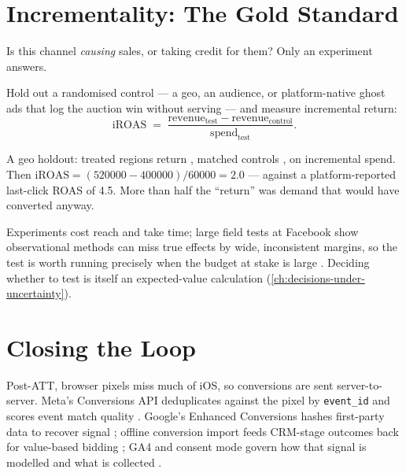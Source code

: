 \section{Incrementality: The Gold Standard}\label{sec:incrementality}

\begin{decision}
Is this channel \emph{causing} sales, or taking credit for them? Only an experiment answers.
\end{decision}

\begin{derivation}
Hold out a randomised control --- a geo, an audience, or platform-native ghost ads that log the auction win without serving \parencite{johnson2017ghost} --- and measure incremental return:
\begin{equation}\label{eq:iroas}
  \mathrm{iROAS} \;=\; \frac{\text{revenue}_\text{test}-\text{revenue}_\text{control}}{\text{spend}_\text{test}} .
\end{equation}
\end{derivation}

\begin{worked}
A geo holdout: treated regions return , matched controls , on  incremental spend. Then $\mathrm{iROAS}=(520000-400000)/60000=\num{2.0}$ --- against a platform-reported last-click ROAS of \num{4.5}. More than half the ``return'' was demand that would have converted anyway.
\end{worked}

\begin{breaks}
Experiments cost reach and take time; large field tests at Facebook show observational methods can miss true effects by wide, inconsistent margins, so the test is worth running precisely when the budget at stake is large \parencite{gordon2019comparison}. Deciding whether to test is itself an expected-value calculation (\cref{ch:decisions-under-uncertainty}).
\end{breaks}

\section{Closing the Loop}\label{sec:closing-loop}

\begin{platform}
Post-ATT, browser pixels miss much of iOS, so conversions are sent server-to-server. Meta's Conversions API deduplicates against the pixel by \texttt{event\_id} and scores event match quality \parencite{metadev-deduplicate-pixel-and-se,metadev-verifying-setup}. Google's Enhanced Conversions hashes first-party data to recover signal \parencite{gads9888656,gads13258081}; offline conversion import feeds CRM-stage outcomes back for value-based bidding \parencite{gads2998031,gdev-upload-offline}; GA4 and consent mode govern how that signal is modelled and what is collected \parencite{ga10597962,gads13695607}.
\end{platform}

